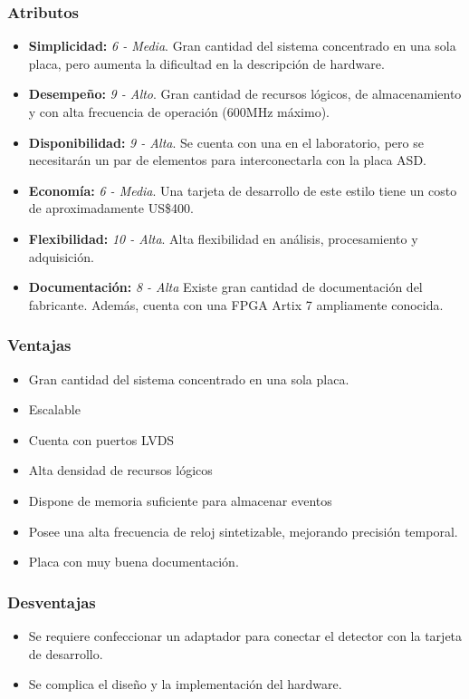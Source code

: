 	\subsubsection*{Atributos}
	\begin{itemize}
		\item \textbf{Simplicidad:}  \textit{6 - Media}. Gran cantidad del sistema concentrado en una sola placa, pero aumenta la dificultad en la descripción de hardware.
		\item \textbf{Desempeño:}  \textit{9 - Alto}. Gran cantidad de recursos lógicos, de almacenamiento y con alta  frecuencia de operación (600MHz máximo).
		\item \textbf{Disponibilidad: } \textit{9 - Alta}. Se cuenta con una en el laboratorio, pero se necesitarán un par de elementos para interconectarla con la placa ASD.
		\item \textbf{Economía: }\textit{6 - Media}. Una tarjeta de desarrollo de este estilo tiene un costo de aproximadamente US\$400.
		\item \textbf{Flexibilidad:} \textit{10 - Alta}. Alta flexibilidad en análisis, procesamiento y adquisición.
		\item \textbf{Documentación:} \textit{8 - Alta} Existe gran cantidad de documentación del fabricante. Además, cuenta con una FPGA Artix 7 ampliamente conocida.
	\end{itemize}
	
	
	\subsubsection*{Ventajas}
	\begin{itemize}
		\item Gran cantidad del sistema concentrado en una sola placa.
		\item Escalable
		\item Cuenta con puertos LVDS
		\item Alta densidad de recursos lógicos
		\item Dispone de memoria suficiente para almacenar eventos
		\item Posee una alta frecuencia de reloj sintetizable, mejorando precisión temporal.
		\item Placa con muy buena documentación.
	\end{itemize}
	
	
	\subsubsection*{Desventajas}
	\begin{itemize}
		\item Se requiere confeccionar un adaptador para conectar el detector con la tarjeta de desarrollo.
		\item Se complica el diseño y la implementación del hardware.
	\end{itemize}
	

